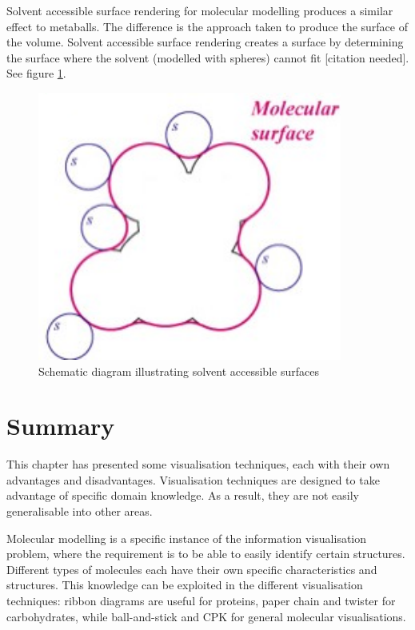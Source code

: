 Solvent accessible surface rendering for molecular modelling produces a similar
effect to metaballs. The difference is the approach taken to produce the
surface of the volume. Solvent accessible surface rendering creates a surface
by determining the surface where the solvent (modelled with spheres) cannot fit
[citation needed]. See figure \ref{fig:background_sas}.

\begin{figure}[h!]
  \begin{center}
    \includegraphics[width=100mm]{sas_ms}
  \end{center}
  \caption{Schematic diagram illustrating solvent accessible surfaces}
  \label{fig:background_sas}
\end{figure}



\section{Summary}
\label{sec:background_end}

This chapter has presented some visualisation techniques, each with their own
advantages and disadvantages. Visualisation techniques are designed to take
advantage of specific domain knowledge. As a result, they are not easily
generalisable into other areas.

Molecular modelling is a specific instance of the information visualisation
problem, where the requirement is to be able to easily identify certain
structures. Different types of molecules each have their own specific
characteristics and structures. This knowledge can be exploited in the
different visualisation techniques: ribbon diagrams are useful for proteins,
paper chain and twister for carbohydrates, while ball-and-stick and CPK for
general molecular visualisations.

